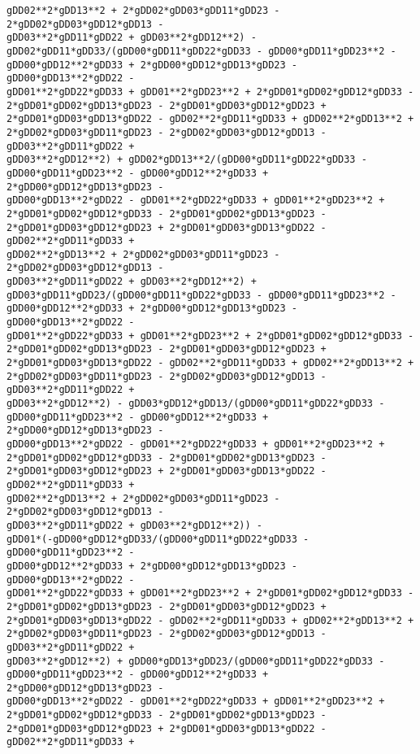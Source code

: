 \documentclass[landscape,letterpaper,10pt,english]{article}
\begin{document}
\begin{Verbatim}[commandchars=\\\{\}]
gDD02**2*gDD13**2 + 2*gDD02*gDD03*gDD11*gDD23 - 2*gDD02*gDD03*gDD12*gDD13 -
gDD03**2*gDD11*gDD22 + gDD03**2*gDD12**2) -
gDD02*gDD11*gDD33/(gDD00*gDD11*gDD22*gDD33 - gDD00*gDD11*gDD23**2 -
gDD00*gDD12**2*gDD33 + 2*gDD00*gDD12*gDD13*gDD23 - gDD00*gDD13**2*gDD22 -
gDD01**2*gDD22*gDD33 + gDD01**2*gDD23**2 + 2*gDD01*gDD02*gDD12*gDD33 -
2*gDD01*gDD02*gDD13*gDD23 - 2*gDD01*gDD03*gDD12*gDD23 +
2*gDD01*gDD03*gDD13*gDD22 - gDD02**2*gDD11*gDD33 + gDD02**2*gDD13**2 +
2*gDD02*gDD03*gDD11*gDD23 - 2*gDD02*gDD03*gDD12*gDD13 - gDD03**2*gDD11*gDD22 +
gDD03**2*gDD12**2) + gDD02*gDD13**2/(gDD00*gDD11*gDD22*gDD33 -
gDD00*gDD11*gDD23**2 - gDD00*gDD12**2*gDD33 + 2*gDD00*gDD12*gDD13*gDD23 -
gDD00*gDD13**2*gDD22 - gDD01**2*gDD22*gDD33 + gDD01**2*gDD23**2 +
2*gDD01*gDD02*gDD12*gDD33 - 2*gDD01*gDD02*gDD13*gDD23 -
2*gDD01*gDD03*gDD12*gDD23 + 2*gDD01*gDD03*gDD13*gDD22 - gDD02**2*gDD11*gDD33 +
gDD02**2*gDD13**2 + 2*gDD02*gDD03*gDD11*gDD23 - 2*gDD02*gDD03*gDD12*gDD13 -
gDD03**2*gDD11*gDD22 + gDD03**2*gDD12**2) +
gDD03*gDD11*gDD23/(gDD00*gDD11*gDD22*gDD33 - gDD00*gDD11*gDD23**2 -
gDD00*gDD12**2*gDD33 + 2*gDD00*gDD12*gDD13*gDD23 - gDD00*gDD13**2*gDD22 -
gDD01**2*gDD22*gDD33 + gDD01**2*gDD23**2 + 2*gDD01*gDD02*gDD12*gDD33 -
2*gDD01*gDD02*gDD13*gDD23 - 2*gDD01*gDD03*gDD12*gDD23 +
2*gDD01*gDD03*gDD13*gDD22 - gDD02**2*gDD11*gDD33 + gDD02**2*gDD13**2 +
2*gDD02*gDD03*gDD11*gDD23 - 2*gDD02*gDD03*gDD12*gDD13 - gDD03**2*gDD11*gDD22 +
gDD03**2*gDD12**2) - gDD03*gDD12*gDD13/(gDD00*gDD11*gDD22*gDD33 -
gDD00*gDD11*gDD23**2 - gDD00*gDD12**2*gDD33 + 2*gDD00*gDD12*gDD13*gDD23 -
gDD00*gDD13**2*gDD22 - gDD01**2*gDD22*gDD33 + gDD01**2*gDD23**2 +
2*gDD01*gDD02*gDD12*gDD33 - 2*gDD01*gDD02*gDD13*gDD23 -
2*gDD01*gDD03*gDD12*gDD23 + 2*gDD01*gDD03*gDD13*gDD22 - gDD02**2*gDD11*gDD33 +
gDD02**2*gDD13**2 + 2*gDD02*gDD03*gDD11*gDD23 - 2*gDD02*gDD03*gDD12*gDD13 -
gDD03**2*gDD11*gDD22 + gDD03**2*gDD12**2)) -
gDD01*(-gDD00*gDD12*gDD33/(gDD00*gDD11*gDD22*gDD33 - gDD00*gDD11*gDD23**2 -
gDD00*gDD12**2*gDD33 + 2*gDD00*gDD12*gDD13*gDD23 - gDD00*gDD13**2*gDD22 -
gDD01**2*gDD22*gDD33 + gDD01**2*gDD23**2 + 2*gDD01*gDD02*gDD12*gDD33 -
2*gDD01*gDD02*gDD13*gDD23 - 2*gDD01*gDD03*gDD12*gDD23 +
2*gDD01*gDD03*gDD13*gDD22 - gDD02**2*gDD11*gDD33 + gDD02**2*gDD13**2 +
2*gDD02*gDD03*gDD11*gDD23 - 2*gDD02*gDD03*gDD12*gDD13 - gDD03**2*gDD11*gDD22 +
gDD03**2*gDD12**2) + gDD00*gDD13*gDD23/(gDD00*gDD11*gDD22*gDD33 -
gDD00*gDD11*gDD23**2 - gDD00*gDD12**2*gDD33 + 2*gDD00*gDD12*gDD13*gDD23 -
gDD00*gDD13**2*gDD22 - gDD01**2*gDD22*gDD33 + gDD01**2*gDD23**2 +
2*gDD01*gDD02*gDD12*gDD33 - 2*gDD01*gDD02*gDD13*gDD23 -
2*gDD01*gDD03*gDD12*gDD23 + 2*gDD01*gDD03*gDD13*gDD22 - gDD02**2*gDD11*gDD33 +

\end{Verbatim}
\end{document}

